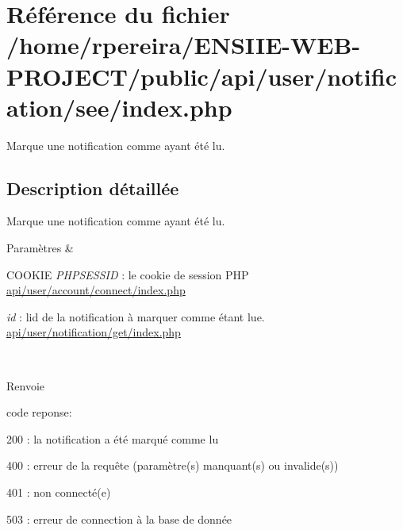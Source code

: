 \hypertarget{user_2notification_2see_2index_8php}{}\section{Référence du fichier /home/rpereira/\+E\+N\+S\+I\+I\+E-\/\+W\+E\+B-\/\+P\+R\+O\+J\+E\+C\+T/public/api/user/notification/see/index.php}
\label{user_2notification_2see_2index_8php}


Marque une notification comme ayant été lu.  




\subsection{Description détaillée}
Marque une notification comme ayant été lu. 


\begin{DoxyParams}{Paramètres}
{\em } & 
\begin{DoxyItemize}
\item C\+O\+O\+K\+IE {\itshape P\+H\+P\+S\+E\+S\+S\+ID} \+: le cookie de session P\+HP \hyperlink{user_2account_2connect_2index_8php}{api/user/account/connect/index.\+php}
\item {\itshape id} \+: l\textquotesingle{}id de la notification à marquer comme étant lue. \hyperlink{user_2notification_2get_2index_8php}{api/user/notification/get/index.\+php} 
\end{DoxyItemize}\\
\hline
\end{DoxyParams}
\begin{DoxyReturn}{Renvoie}

\begin{DoxyItemize}
\item code reponse\+:
\begin{DoxyItemize}
\item 200 \+: la notification a été marqué comme lu
\item 400 \+: erreur de la requête (paramètre(s) manquant(s) ou invalide(s))
\item 401 \+: non connecté(e)
\item 503 \+: erreur de connection à la base de donnée 
\end{DoxyItemize}
\end{DoxyItemize}
\end{DoxyReturn}

